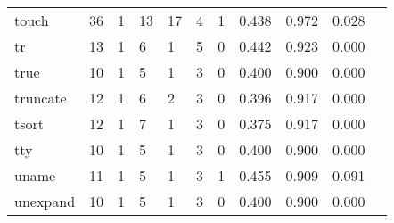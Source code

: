 \begin{longtable}{lp{1.10cm}p{1.10cm}p{1.10cm}p{1.10cm}p{1.10cm}p{1.10cm}p{1.10cm}p{1.10cm}p{1.10cm}p{1.10cm}}
touch     &                     36 &                                  1 &                                13 &                               17 &                                 4 &                               1 &                          0.438 &                                 0.972 &                               0.028 \\
tr        &                     13 &                                  1 &                                 6 &                                1 &                                 5 &                               0 &                          0.442 &                                 0.923 &                               0.000 \\
true      &                     10 &                                  1 &                                 5 &                                1 &                                 3 &                               0 &                          0.400 &                                 0.900 &                               0.000 \\
truncate  &                     12 &                                  1 &                                 6 &                                2 &                                 3 &                               0 &                          0.396 &                                 0.917 &                               0.000 \\
tsort     &                     12 &                                  1 &                                 7 &                                1 &                                 3 &                               0 &                          0.375 &                                 0.917 &                               0.000 \\
tty       &                     10 &                                  1 &                                 5 &                                1 &                                 3 &                               0 &                          0.400 &                                 0.900 &                               0.000 \\
uname     &                     11 &                                  1 &                                 5 &                                1 &                                 3 &                               1 &                          0.455 &                                 0.909 &                               0.091 \\
unexpand  &                     10 &                                  1 &                                 5 &                                1 &                                 3 &                               0 &                          0.400 &                                 0.900 &                               0.000 \\

\end{longtable}
